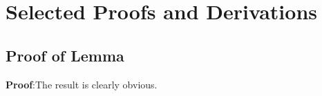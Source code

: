 
\chapter[SELECTED PROOFS AND DERIVATIONS]{Selected Proofs and Derivations}

\section{Proof of Lemma}

\noindent \textbf{Proof}:\quad The result is clearly obvious.
